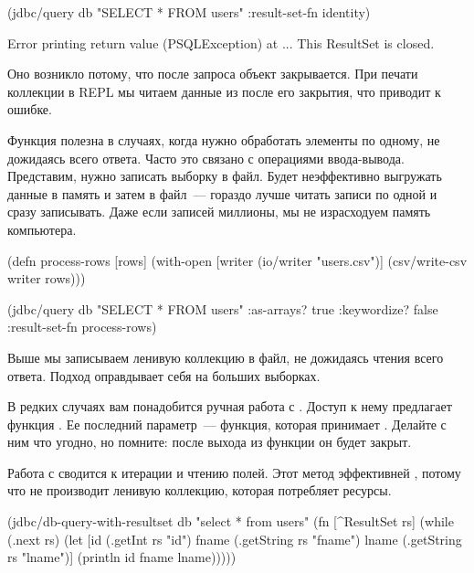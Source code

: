 \begin{english}
  \begin{clojure}
(jdbc/query db
            "SELECT * FROM users"
            {:result-set-fn identity})

Error printing return value (PSQLException) at ...
This ResultSet is closed.
  \end{clojure}
\end{english}

Оно возникло потому, что после запроса объект  закрывается. При печати коллекции в REPL мы читаем данные из  после его закрытия, что приводит к ошибке.

Функция  полезна в случаях, когда нужно обработать элементы по одному, не дожидаясь всего ответа. Часто это связано с операциями ввода-вывода. Представим, нужно записать выборку в файл. Будет неэффективно выгружать данные в память и затем в файл~--- гораздо лучше читать записи по одной и сразу записывать. Даже если записей миллионы, мы не израсходуем память компьютера.

\begin{english}
  \begin{clojure}
(defn process-rows
  [rows]
  (with-open [writer (io/writer "users.csv")]
    (csv/write-csv writer rows)))

(jdbc/query db
            "SELECT * FROM users"
            {:as-arrays? true
             :keywordize? false
             :result-set-fn process-rows})
  \end{clojure}
\end{english}

Выше мы записываем ленивую коллекцию  в файл, не дожидаясь чтения всего ответа. Подход оправдывает себя на больших выборках.

В редких случаях вам понадобится ручная работа с . Доступ к нему предлагает функция . Ее последний параметр~--- функция, которая принимает . Делайте с ним что угодно, но помните: после выхода из функции он будет закрыт.

Работа с  сводится к итерации  и чтению полей. Этот метод эффективней , потому что не производит ленивую коллекцию, которая потребляет ресурсы.

\begin{english}
  \begin{clojure}
(jdbc/db-query-with-resultset
 db
 "select * from users"
 (fn [^ResultSet rs]
   (while (.next rs)
     (let [id
           (.getInt rs "id")
           fname
           (.getString rs "fname")
           lname
           (.getString rs "lname")]
       (println id fname lname)))))
  \end{clojure}
\end{english}

